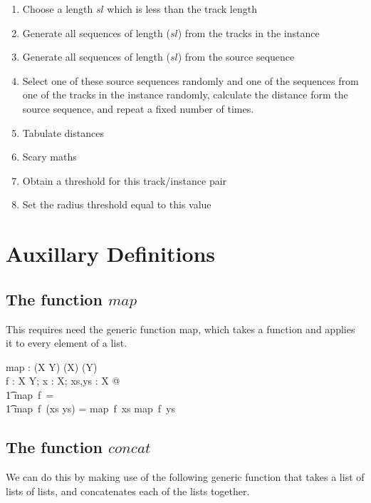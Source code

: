 \documentclass[11pt]{article}
\begin{document}
\begin{enumerate}
\item Choose a length $sl$ which is less than the track length
\item Generate all sequences of length  ($sl$)  from the tracks in the instance
\item Generate all sequences of length  ($sl$) from the source sequence
\item Select one of these source  sequences randomly and one of the sequences from one of the tracks in the instance randomly, calculate the distance form the source sequence, and repeat a fixed number of times. 
\item Tabulate distances
\item Scary maths
 \item Obtain a threshold for this track/instance pair 
 \item Set the radius threshold equal to this  value
 \end{enumerate}

\appendix
\section{Auxillary Definitions}

\subsection{The function $map$}

This requires need the generic function  map, which takes a function and applies it to every element of a list.

\begin{gendef}[X,Y]
map : (X \fun Y) \fun (\seq X) \fun (\seq Y) \\
\where 
\forall  f : X \fun Y; x : X; xs,ys : \seq X @ \\
\t1		map~f~\langle \rangle = \langle \rangle \land \\
\t1 		map~f~(xs \cat ys) = map~f~xs \cat map~f~ys 
\end{gendef}


\subsection{The function $concat$}

We can do this by making use of the following generic function that takes a list of lists of lists, and concatenates each of the lists together. 
\end{document}
